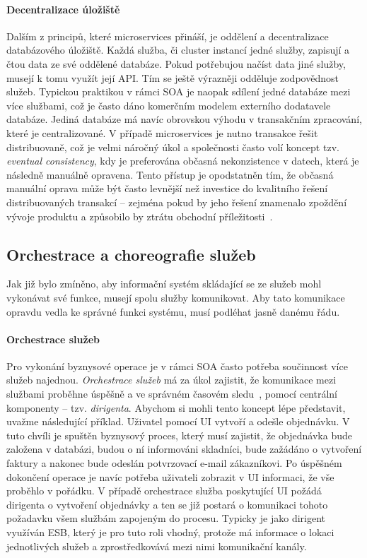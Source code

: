 \paragraph{Decentralizace úložiště}
Dalším z principů, které microservices přináší, je oddělení a decentralizace
databázového úložiště. Každá služba, či cluster instancí jedné služby, zapisují
a čtou data ze své oddělené databáze. Pokud potřebujou načíst data jiné služby,
musejí k tomu využít její \gls{API}. Tím se ještě výrazněji odděluje zodpovědnost služeb.
Typickou praktikou v rámci \gls{SOA} je naopak sdílení jedné databáze mezi více službami,
což je často dáno komerčním modelem externího dodatavele databáze. Jediná databáze
má navíc obrovskou výhodu v transakčním zpracování, které je centralizované.
V případě microservices je nutno transakce řešit distribuovaně, což je velmi náročný
úkol a společnosti často volí koncept tzv. \textit{eventual consistency}, kdy je
preferována občasná nekonzistence v datech, která je následně manuálně opravena.
Tento přístup je opodstatněn tím, že občasná manuální oprava může být
často levnější než investice do kvalitního řešení distribuovaných transakcí –
zejména pokud by jeho řešení znamenalo zpoždění vývoje produktu a způsobilo
by ztrátu obchodní příležitosti~\cite{lewis2014microservices}.

\subsection{Orchestrace a choreografie služeb}

Jak již bylo zmíněno, aby informační systém skládající se ze služeb mohl vykonávat
své funkce, musejí spolu služby komunikovat. Aby tato komunikace opravdu vedla
ke správné funkci systému, musí podléhat jasně danému řádu.

\paragraph{Orchestrace služeb}
Pro vykonání byznysové operace je v rámci \gls{SOA} často potřeba součinnost více služeb
najednou. \textit{Orchestrace služeb} má za úkol zajistit, že komunikace mezi službami
proběhne úspěšně a ve správném časovém sledu~\cite{orchestration},
pomocí centrální komponenty – tzv. \textit{dirigenta}.
Abychom si mohli tento koncept lépe představit, uvažme následující příklad. Uživatel
pomocí \gls{UI} vytvoří a odešle objednávku. V tuto chvíli
je spuštěn byznysový proces, který musí zajistit, že objednávka bude založena v databázi,
budou o ní informováni skladníci, bude zažádáno o vytvoření faktury a nakonec bude odeslán
potvrzovací e-mail zákazníkovi. Po úspěšném dokončení operace je navíc potřeba uživateli
zobrazit v \gls{UI} informaci, že vše proběhlo v pořádku. V případě orchestrace služba
poskytující \gls{UI} požádá dirigenta o vytvoření objednávky a ten se již postará o
komunikaci tohoto požadavku všem službám zapojeným do procesu.
Typicky je jako dirigent využíván \gls{ESB}, který je pro tuto roli vhodný,
protože má informace o lokaci jednotlivých služeb a zprostředkovává mezi nimi
komunikační kanály.

